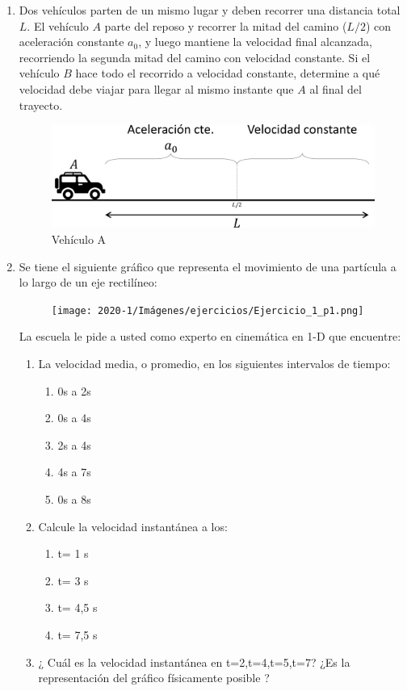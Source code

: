 \documentclass[letterpaper,11pt]{article}
\begin{document}
\begin{enumerate}
\item Dos vehículos parten de un mismo lugar y deben recorrer una distancia total $L$. El vehículo $A$ parte del reposo y recorrer la mitad del camino ($L/2$) con aceleración constante $a_0$, y luego mantiene la velocidad final alcanzada, recorriendo la segunda mitad del camino con velocidad constante. Si el vehículo $B$ hace todo el recorrido a velocidad constante, determine a qué velocidad debe viajar para llegar al mismo instante que $A$ al final del trayecto.

\begin{figure}[H]
    \centering
    \includegraphics[width = 0.6\linewidth]{2021-1/Imagenes/ejercicios/ej1.pdf}
    \caption{Vehículo A}
\end{figure}

\item Se tiene el siguiente gráfico que representa el movimiento de una partícula a lo largo de un eje rectilíneo:
    \begin{figure}[H]
        \centering
        \texttt{[image: 2020-1/Imágenes/ejercicios/Ejercicio\_1\_p1.png]}
    \end{figure}
La escuela le pide a usted como experto en cinemática en 1-D que encuentre:
\begin{enumerate}
    \item La velocidad media, o promedio, en los siguientes intervalos de tiempo:
        \begin{enumerate}
            \item 0s a 2s
            \item 0s a 4s
            \item 2s a 4s
            \item 4s a 7s 
            \item 0s a 8s
        \end{enumerate}
    \item Calcule la velocidad instantánea a los:
        \begin{enumerate}
            \item t= 1 s
            \item t= 3 s
            \item t= 4,5 s
            \item t= 7,5 s
        \end{enumerate}
    \item ¿ Cuál es la velocidad instantánea en t=2,t=4,t=5,t=7? ¿Es la representación del gráfico físicamente posible ?
\end{enumerate}


\end{enumerate}
\end{document}
